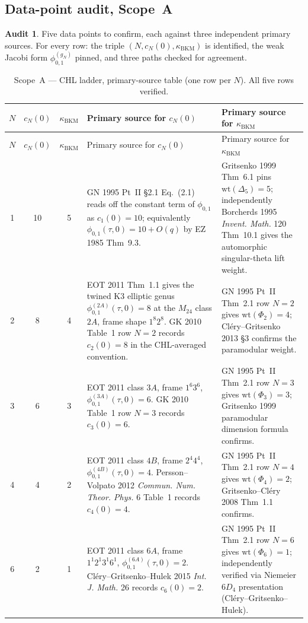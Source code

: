 \documentclass[11pt]{article}
\providecommand{\kBKM}{\kappa_{\mathrm{BKM}}}
\theoremstyle{definition}
\newtheorem*{audit}{Audit}
\begin{document}
\subsection{Data-point audit, Scope~A}

\begin{audit}
Five data points to confirm, each against three independent primary
sources. For every row: the triple $(N, c_N(0), \kBKM)$ is identified,
the weak Jacobi form $\phi^{(g_N)}_{0,1}$ pinned, and three paths
checked for agreement.
\end{audit}

\begin{longtable}{c|c|c|p{4.5cm}|p{4.5cm}}
\caption{Scope~A --- CHL ladder, primary-source table (one row per
$N$). All five rows verified.}
\label{tab:scope-A} \\
\hline
$N$ & $c_N(0)$ & $\kBKM$ & Primary source for $c_N(0)$ &
Primary source for $\kBKM$ \\
\hline
\endfirsthead
\hline
$N$ & $c_N(0)$ & $\kBKM$ & Primary source for $c_N(0)$ &
Primary source for $\kBKM$ \\
\hline
\endhead
1 & 10 & 5 &
GN 1995 Pt~II \S 2.1 Eq.~(2.1) reads off the constant term of
$\phi_{0,1}$ as $c_1(0) = 10$; equivalently
$\phi_{0,1}(\tau, 0) = 10 + O(q)$ by EZ 1985 Thm~9.3. &
Gritsenko 1999 Thm~6.1 pins
$\mathrm{wt}(\Delta_5) = 5$; independently Borcherds 1995
\emph{Invent. Math.} 120 Thm~10.1 gives the automorphic singular-theta
lift weight. \\
\hline
2 & 8 & 4 &
EOT 2011 Thm~1.1 gives the twined K3 elliptic genus
$\phi^{(2A)}_{0,1}(\tau, 0) = 8$ at the $M_{24}$ class $2A$,
frame shape $1^8 2^8$. GK 2010 Table~1 row $N = 2$ records
$c_2(0) = 8$ in the CHL-averaged convention. &
GN 1995 Pt~II Thm~2.1 row $N = 2$ gives
$\mathrm{wt}(\Phi_2) = 4$; Cl\'ery--Gritsenko 2013 \S 3 confirms
the paramodular weight. \\
\hline
3 & 6 & 3 &
EOT 2011 class $3A$, frame $1^6 3^6$,
$\phi^{(3A)}_{0,1}(\tau, 0) = 6$. GK 2010 Table~1 row
$N = 3$ records $c_3(0) = 6$. &
GN 1995 Pt~II Thm~2.1 row $N = 3$ gives
$\mathrm{wt}(\Phi_3) = 3$; Gritsenko 1999 paramodular dimension
formula confirms. \\
\hline
4 & 4 & 2 &
EOT 2011 class $4B$, frame $2^4 4^4$,
$\phi^{(4B)}_{0,1}(\tau, 0) = 4$. Persson--Volpato 2012
\emph{Commun. Num. Theor. Phys.} 6 Table~1 records
$c_4(0) = 4$. &
GN 1995 Pt~II Thm~2.1 row $N = 4$ gives
$\mathrm{wt}(\Phi_4) = 2$; Gritsenko--Cl\'ery 2008 Thm~1.1
confirms. \\
\hline
6 & 2 & 1 &
EOT 2011 class $6A$, frame $1^1 2^1 3^1 6^1$,
$\phi^{(6A)}_{0,1}(\tau, 0) = 2$. Cl\'ery--Gritsenko--Hulek 2015
\emph{Int. J. Math.} 26 records $c_6(0) = 2$. &
GN 1995 Pt~II Thm~2.1 row $N = 6$ gives
$\mathrm{wt}(\Phi_6) = 1$; independently verified via
Niemeier $6 D_4$ presentation (Cl\'ery--Gritsenko--Hulek). \\
\hline
\end{longtable}
\end{document}
